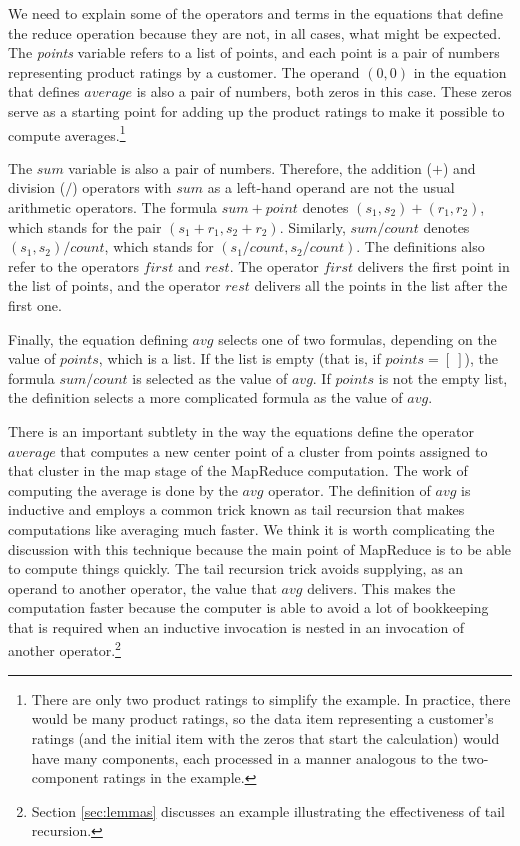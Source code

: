 We need to explain some of the operators and terms
in the equations that define the reduce operation
because they are not, in all cases, what might be expected.
The \emph{points} variable refers to a list of points,
and each point is a pair of numbers representing product ratings
by a customer.
The operand $(0,0)$ in the equation that defines $average$ is
also a pair of numbers, both zeros in this case.
These zeros serve as a starting point for adding
up the product ratings to make it possible to compute
averages.\footnote{There are only two product ratings
to simplify the example. In practice, there would be
many product ratings, so the data item representing
a customer's ratings (and the initial item with the
zeros that start the calculation)
would have many components, each processed in a manner analogous
to the two-component ratings in the example.}

The $sum$ variable is also a pair of numbers.
Therefore, the addition ($+$) and division ($/$) operators
with $sum$ as a left-hand operand are not the usual arithmetic operators.
The formula $sum + point$ denotes $(s_1, s_2) + (r_1,r_2)$,
which stands for the pair $(s_1+r_1, s_2+r_2)$.
Similarly, $sum/count$ denotes $(s_1,s_2)/count$,
which stands for $(s_1/count, s_2/count)$.
The definitions also refer to the operators $first$ and $rest$.
The operator $first$ delivers the first point in the list of points,
and the operator $rest$ delivers all the points in the list
after the first one.

Finally, the equation defining $avg$ selects one of two formulas,
depending on the value of $points$, which is a list.
If the list is empty (that is, if $points = [~]$),
the formula $sum/count$ is selected as the value of $avg$.
If $points$ is not the empty list, the definition selects
a more complicated formula as the value of $avg$.

There is an important subtlety in the way the equations define
the operator $average$ that computes a new center point of a cluster
from points assigned to that cluster in the map stage of the
MapReduce computation.
The work of computing the average is done by the $avg$ operator.
The definition of $avg$ is inductive and
employs a common trick known as tail recursion
that makes computations like averaging much faster.
We think it is worth complicating the discussion
with this technique because the main point
of MapReduce is to be able to compute things quickly.
The tail recursion
trick avoids supplying, as an operand to another operator,
the value that $avg$ delivers.
This makes the computation
faster because the computer is able to avoid a lot of bookkeeping
that is required when an inductive
invocation is nested in an invocation of another
operator.\footnote{Section \ref{sec:lemmas} discusses an
example illustrating the effectiveness of tail recursion.}


